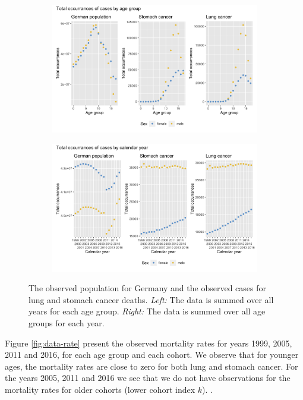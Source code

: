 \begin{figure}
    \centering
    \begin{subfigure}[b]{.6\linewidth}
        \includegraphics[width=\linewidth]{real-data/real-data-univariate/Figures/data-age-total.png}
    \end{subfigure}
    
    \begin{subfigure}[b]{.6\linewidth}
        \includegraphics[width=\linewidth]{real-data/real-data-univariate/Figures/data-year-total.png}
    \end{subfigure}
    \caption{The observed population for Germany and the observed cases for lung and stomach cancer deaths. \textit{Left:} The data is summed over all years for each age group. \textit{Right:} The data is summed over all age groups for each year.}
    \label{fig:data-total}
\end{figure}

Figure \ref{fig:data-rate} present the observed mortality rates for years 1999, 2005, 2011 and 2016, for each age group and each cohort. We observe that for younger ages, the mortality rates are close to zero for both lung and stomach cancer. For the years 2005, 2011 and 2016 we see that we do not have observations for the  mortality rates for older cohorts (lower cohort index $k$). .

